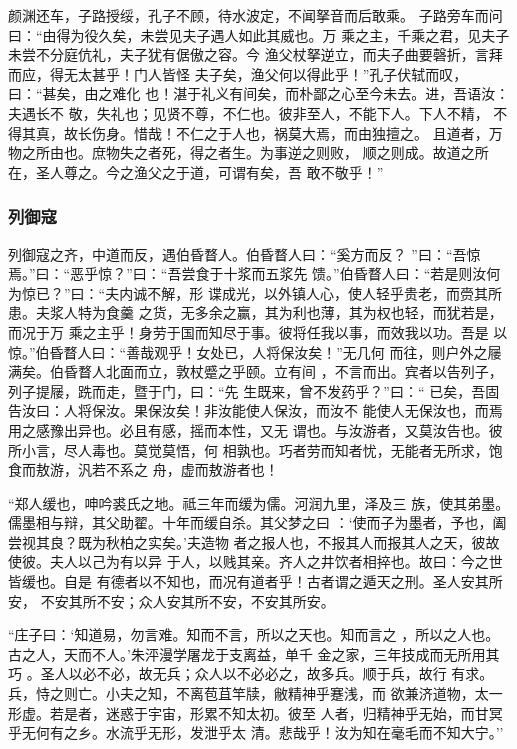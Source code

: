 \documentclass[]{article}
\begin{document}
颜渊还车，子路授绥，孔子不顾，待水波定，不闻拏音而后敢乘。
子路旁车而问曰：``由得为役久矣，未尝见夫子遇人如此其威也。万
乘之主，千乘之君，见夫子未尝不分庭伉礼，夫子犹有倨傲之容。今
渔父杖拏逆立，而夫子曲要磬折，言拜而应，得无太甚乎！门人皆怪
夫子矣，渔父何以得此乎！''孔子伏轼而叹，曰：``甚矣，由之难化
也！湛于礼义有间矣，而朴鄙之心至今未去。进，吾语汝：夫遇长不
敬，失礼也；见贤不尊，不仁也。彼非至人，不能下人。下人不精，
不得其真，故长伤身。惜哉！不仁之于人也，祸莫大焉，而由独擅之。
且道者，万物之所由也。庶物失之者死，得之者生。为事逆之则败，
顺之则成。故道之所在，圣人尊之。今之渔父之于道，可谓有矣，吾
敢不敬乎！''

\hypertarget{header-n998}{%
\subsubsection{列御寇}\label{header-n998}}

列御寇之齐，中道而反，遇伯昏瞀人。伯昏瞀人曰：``奚方而反？
''曰：``吾惊焉。''曰：``恶乎惊？''曰：``吾尝食于十浆而五浆先
馈。''伯昏瞀人曰：``若是则汝何为惊已？''曰：``夫内诚不解，形
谍成光，以外镇人心，使人轻乎贵老，而赍其所患。夫浆人特为食羹
之货，无多余之赢，其为利也薄，其为权也轻，而犹若是，而况于万
乘之主乎！身劳于国而知尽于事。彼将任我以事，而效我以功。吾是
以惊。''伯昏瞀人曰：``善哉观乎！女处已，人将保汝矣！''无几何
而往，则户外之屦满矣。伯昏瞀人北面而立，敦杖蹙之乎颐。立有间
，不言而出。宾者以告列子，列子提屦，跣而走，暨于门，曰：``先
生既来，曾不发药乎？''曰：``
已矣，吾固告汝曰：人将保汝。果保汝矣！非汝能使人保汝，而汝不
能使人无保汝也，而焉用之感豫出异也。必且有感，摇而本性，又无
谓也。与汝游者，又莫汝告也。彼所小言，尽人毒也。莫觉莫悟，何
相孰也。巧者劳而知者忧，无能者无所求，饱食而敖游，汎若不系之
舟，虚而敖游者也！

``郑人缓也，呻吟裘氏之地。祗三年而缓为儒。河润九里，泽及三
族，使其弟墨。儒墨相与辩，其父助翟。十年而缓自杀。其父梦之曰
：`使而子为墨者，予也，阖尝视其良？既为秋柏之实矣。'夫造物
者之报人也，不报其人而报其人之天，彼故使彼。夫人以己为有以异
于人，以贱其亲。齐人之井饮者相捽也。故曰：今之世皆缓也。自是
有德者以不知也，而况有道者乎！古者谓之遁天之刑。圣人安其所安，
不安其所不安；众人安其所不安，不安其所安。

``庄子曰：`知道易，勿言难。知而不言，所以之天也。知而言之
，所以之人也。古之人，天而不人。'朱泙漫学屠龙于支离益，单千
金之家，三年技成而无所用其巧
。圣人以必不必，故无兵；众人以不必必之，故多兵。顺于兵，故行
有求。兵，恃之则亡。小夫之知，不离苞苴竿牍，敝精神乎蹇浅，而
欲兼济道物，太一形虚。若是者，迷惑于宇宙，形累不知太初。彼至
人者，归精神乎无始，而甘冥乎无何有之乡。水流乎无形，发泄乎太
清。悲哉乎！汝为知在毫毛而不知大宁。''
\end{document}
